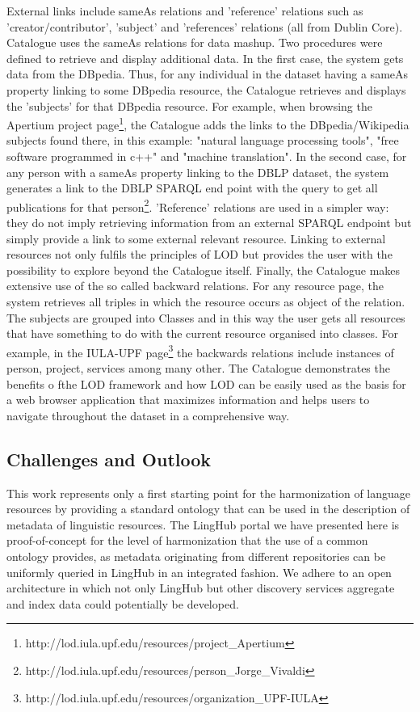 \documentclass{llncs}
\begin{document}
{External links include sameAs relations and 'reference' relations such as 'creator/contributor', 'subject' and 'references' relations (all from Dublin Core). Catalogue uses the sameAs relations for data mashup. Two procedures were defined to retrieve and display additional data. In the first case, the system gets data from the DBpedia. Thus, for any individual in the dataset having a sameAs property linking to some DBpedia resource, the Catalogue retrieves and displays the 'subjects' for that DBpedia resource. For example, when browsing the Apertium project page\footnote{http://lod.iula.upf.edu/resources/project\_Apertium}, the Catalogue adds the links to the DBpedia/Wikipedia subjects found there, in this example: "natural language processing tools", "free software programmed in c++" and "machine translation". In the second case, for any person with a sameAs property linking to the DBLP dataset, the system generates a link to the DBLP SPARQL end point with the query to get all publications for that person\footnote{http://lod.iula.upf.edu/resources/person\_Jorge\_Vivaldi}. 'Reference' relations are used in a simpler way: they do not imply retrieving information from an external SPARQL endpoint but simply provide a link to some external relevant resource. Linking to external resources not only fulfils the principles of LOD but provides the user with the possibility to explore beyond the Catalogue itself.
Finally, the Catalogue makes extensive use of the so called backward relations. For any resource page, the system retrieves all triples in which the resource occurs as object of the relation. The subjects are grouped into Classes and in this way the user gets all resources that have something to do with the current resource organised into classes. For example, in the IULA-UPF page\footnote{http://lod.iula.upf.edu/resources/organization\_UPF-IULA} the backwards relations include instances of person, project, services among many other.
The Catalogue demonstrates the benefits o fthe LOD framework and how LOD can be easily used as the basis for a web browser application that maximizes information and helps users to navigate throughout the dataset in a comprehensive way.

\subsection{Challenges and Outlook}
\label{sec:challenges}

This work represents only a first starting point for the harmonization of language resources by providing a standard ontology that can be used in the description of metadata of linguistic resources. The LingHub portal we have presented here is proof-of-concept for the level of harmonization that the use of a common ontology provides, as metadata originating from different repositories can be uniformly queried in LingHub in an integrated fashion. We adhere to an open architecture in which not only LingHub but other discovery services aggregate and index data could potentially be developed. 

}
\end{document}

